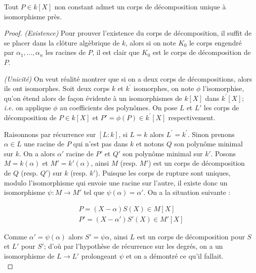 \documentclass[a4paper]{article} %
\numberwithin{equation}{section}
\begin{document}
\begin{thm}
\label{cordec}
Tout $P\in k[X]$ non constant admet un corps de décomposition unique à 
isomorphisme près.
\end{thm}
\begin{proof}
\textit{(Existence)}
Pour prouver l'existence du corps de décomposition, il suffit de se placer 
dans la clôture algèbrique de $k$, alors si on note $K_0$ le corps engendré 
par $\alpha_1,\dots,\alpha_n$ les racines de $P$, il est clair que $K_0$ est 
le corps de décomposition de $P$.\par
\textit{(Unicité)}
On veut réalité montrer que si on a deux corps de décompositions, alors ils ont
isomorphes. Soit deux corps $k$ et $k^{\prime}$ isomorphes, on note $\phi$
l'isomorphise, qu'on étend alors de façon évidente à un isomorphismes de $k[X]$ 
dans $k^{\prime}[X]$; \textit{i.e.} on applique $\phi$ au coefficients des 
polynômes. On pose  $L$ et $L'$ les corps de décomposition de $P\in k[X]$ et $P'
= \phi(P) \in k^{\prime}[X]$ respectivement.\par
Raisonnons par récurrence sur $[L:k]$, si $L = k$ alors $L^{\prime} =
k^{\prime}$. Sinon prenons $\alpha\in L$ une racine de $P$ qui n'est pas dans
$k$ et notons $Q$ son polynôme minimal sur $k$. On a alors $\alpha'$ racine de 
$P'$ et $Q'$ son polynôme minimal sur $k'$. Posons $M = k(\alpha)$ et $M' =
k'(\alpha)$, ainsi $M$ (resp. $M'$) est un corps de décomposition de $Q$ (resp.
$Q'$) sur $k$ (resp. $k'$). Puisque les corps de rupture sont uniques, modulo
l'isomorphisme qui envoie une racine sur l'autre, il existe donc un isomorphisme
$\psi : M \to M'$ tel que $\psi(\alpha) = \alpha'$. On a la situation suivante :

\begin{align*}
&P = (X - \alpha)S(X)\in M[X]\\
&P' = (X - \alpha')S'(X)\in M'[X]
\end{align*}

Comme $\alpha' = \psi(\alpha)$ alors $S'=\psi{\alpha}$, ainsi $L$ est un corps
de décomposition pour $S$ et $L'$ pour $S'$; d'où par l'hypothèse de récurrence
sur les degrés, on a un isomorphisme de $L \to L'$ prolongeant $\psi$ et on a 
démontré ce qu'il fallait.\\
\end{proof}
\end{document}

